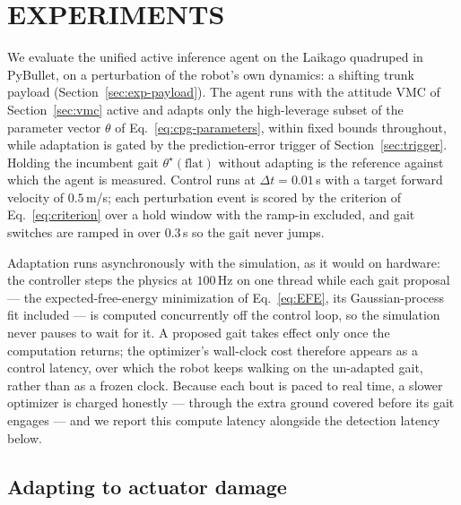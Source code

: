 \documentclass[letterpaper, 10 pt, conference]{ieeeconf}  %
\begin{document}
\section{EXPERIMENTS}
\label{sec:experiments}

We evaluate the unified active inference agent on the Laikago quadruped in PyBullet, on a perturbation of the robot's own dynamics: a shifting trunk payload (Section~\ref{sec:exp-payload}).
The agent runs with the attitude VMC of Section~\ref{sec:vmc} active and adapts only the high-leverage subset of the parameter vector $\theta$ of Eq.~\ref{eq:cpg-parameters}, within fixed bounds throughout, while adaptation is gated by the prediction-error trigger of Section~\ref{sec:trigger}.
Holding the incumbent gait $\theta^{\star}(\text{flat})$ without adapting is the reference against which the agent is measured.
Control runs at $\Delta t = 0.01$\,s with a target forward velocity of $0.5$\,m/s; each perturbation event is scored by the criterion of Eq.~\ref{eq:criterion} over a hold window with the ramp-in excluded, and gait switches are ramped in over $0.3$\,s so the gait never jumps.

Adaptation runs asynchronously with the simulation, as it would on hardware: the controller steps the physics at $100$\,Hz on one thread while each gait proposal --- the expected-free-energy minimization of Eq.~\ref{eq:EFE}, its Gaussian-process fit included --- is computed concurrently off the control loop, so the simulation never pauses to wait for it.
A proposed gait takes effect only once the computation returns; the optimizer's wall-clock cost therefore appears as a control latency, over which the robot keeps walking on the un-adapted gait, rather than as a frozen clock.
Because each bout is paced to real time, a slower optimizer is charged honestly --- through the extra ground covered before its gait engages --- and we report this compute latency alongside the detection latency below.

\iffalse  %
\subsection{Adapting to actuator damage}
\label{sec:exp-damage}
\end{document}
